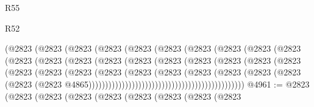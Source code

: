 \begin{lexlean}{R55}
\begin{lexlean}{R52}
\begin{coremodule}
{{{{{{{{{{{{{{{{{{{{{{{{{{{{{{{{{{{{{{{{{{{{{{{{{{{{{{{{{{{{{{{{{{{{{{{{{{{{{{{{{{{{{{{{{{{{{{{{{{{{{{{{{{{{{{{{{{{{{{{{{{{{{{{{{{{{{{{{{{{{{{{{{{{{{{{{{{{{{{{{{{{{{{{{{{{{{{{{{{{{{{{{{{{{{{{{{{{{{{                                  (@2823
                                    (@2823
                                      (@2823
                                        (@2823
                                          (@2823
                                            (@2823
                                              (@2823
                                                (@2823
                                                  (@2823
                                                    (@2823
                                                      (@2823
                                                        (@2823
                                                          (@2823
                                                            (@2823
                                                              (@2823
                                                                (@2823
                                                                  (@2823
                                                                    (@2823
                                                                      (@2823
                                                                        (@2823
                                                                          (@2823
                                                                            (@2823
                                                                              (@2823
                                                                                (@2823
                                                                                  (@2823
                                                                                    (@2823
                                                                                      (@2823
                                                                                        (@2823
                                                                                          (@2823
                                                                                            (@2823
                                                                                              (@2823
                                                                                                (@2823
                                                                                                  @4865)))))))))))))))))))))))))))))))))))))))))))))))
@4961 := @2823
    (@2823
      (@2823
        (@2823
          (@2823
            (@2823
              (@2823
                (@2823
                  (@2823
}}}}}}}}}}}}}}}}}}}}}}}}}}}}}}}}}}}}}}}}}}}}}}}}}}}}}}}}}}}}}}}}}}}}}}}}}}}}}}}}}}}}}}}}}}}}}}}}}}}}}}}}}}}}}}}}}}}}}}}}}}}}}}}}}}}}}}}}}}}}}}}}}}}}}}}}}}}}}}}}}}}}}}}}}}}}}}}}}}}}}}}}}}}}}}}}}}}}}}
\end{coremodule}
\end{lexlean}
\end{lexlean}
